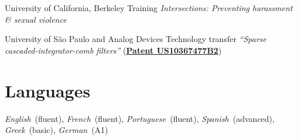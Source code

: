 \documentclass{cvlfoc}
\begin{document}
\begin{entrydate}
		{University of California, Berkeley}
		{Training}
		{\emph{Intersections: Preventing harassment \& sexual violence}}

		{University of S\~{a}o Paulo {\normalfont and} Analog Devices}
		{Technology transfer}
		{\emph{``Sparse cascaded-integrator-comb filters''}
		(\href{https://patents.google.com/patent/US10367477B2}{\textbf{Patent US10367477B2}})}
\end{entrydate}



\section*{Languages}
\vspace{0.2\baselineskip}

\textit{English}~(fluent),
\textit{French}~(fluent),
\textit{Portuguese}~(fluent),
\textit{Spanish}~(advanced),
\textit{Greek}~(basic),
\textit{German}~(A1)


\end{document}
